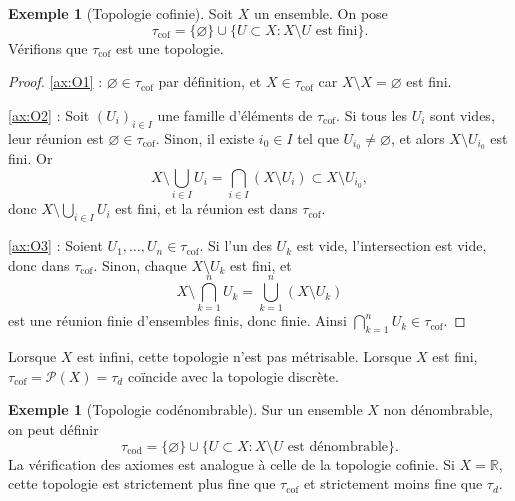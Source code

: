 \documentclass[12pt,a4paper,openany]{book}
\theoremstyle{definition}
\theoremstyle{cours}
\theoremstyle{coursnormal}
\newtheorem{exemple}[theoreme]{Exemple}
\newcommand{\R}{\mathbb{R}}
\begin{document}
\begin{exemple}[Topologie cofinie]\label{ex:topo-cofinie}
  Soit $X$ un ensemble. On pose
  \[
    \tau_{\mathrm{cof}} = \{\varnothing\} \cup \{U \subset X : X \setminus U \text{ est fini}\}.
  \]
  Vérifions que $\tau_{\mathrm{cof}}$ est une topologie.
  \begin{proof}
    \ref{ax:O1} : $\varnothing \in \tau_{\mathrm{cof}}$ par définition, et $X \in \tau_{\mathrm{cof}}$ car $X \setminus X = \varnothing$ est fini.

    \ref{ax:O2} : Soit $(U_i)_{i \in I}$ une famille d'éléments de $\tau_{\mathrm{cof}}$. Si tous les $U_i$ sont vides, leur réunion est $\varnothing \in \tau_{\mathrm{cof}}$. Sinon, il existe $i_0 \in I$ tel que $U_{i_0} \neq \varnothing$, et alors $X \setminus U_{i_0}$ est fini. Or
    \[
      X \setminus \bigcup_{i \in I} U_i = \bigcap_{i \in I}(X \setminus U_i) \subset X \setminus U_{i_0},
    \]
    donc $X \setminus \bigcup_{i \in I} U_i$ est fini, et la réunion est dans $\tau_{\mathrm{cof}}$.

    \ref{ax:O3} : Soient $U_1, \ldots, U_n \in \tau_{\mathrm{cof}}$. Si l'un des $U_k$ est vide, l'intersection est vide, donc dans $\tau_{\mathrm{cof}}$. Sinon, chaque $X \setminus U_k$ est fini, et
    \[
      X \setminus \bigcap_{k=1}^n U_k = \bigcup_{k=1}^n (X \setminus U_k)
    \]
    est une réunion finie d'ensembles finis, donc finie. Ainsi $\bigcap_{k=1}^n U_k \in \tau_{\mathrm{cof}}$.
  \end{proof}

  Lorsque $X$ est infini, cette topologie n'est pas métrisable. Lorsque $X$ est fini, $\tau_{\mathrm{cof}} = \mathcal{P}(X) = \tau_d$ coïncide avec la topologie discrète.
\end{exemple}

\begin{exemple}[Topologie codénombrable]\label{ex:topo-codenombrable}
  Sur un ensemble $X$ non dénombrable, on peut définir
  \[
    \tau_{\mathrm{cod}} = \{\varnothing\} \cup \{U \subset X : X \setminus U \text{ est dénombrable}\}.
  \]
  La vérification des axiomes est analogue à celle de la topologie cofinie. Si $X = \R$, cette topologie est strictement plus fine que $\tau_{\mathrm{cof}}$ et strictement moins fine que $\tau_d$.
\end{exemple}
\end{document}
